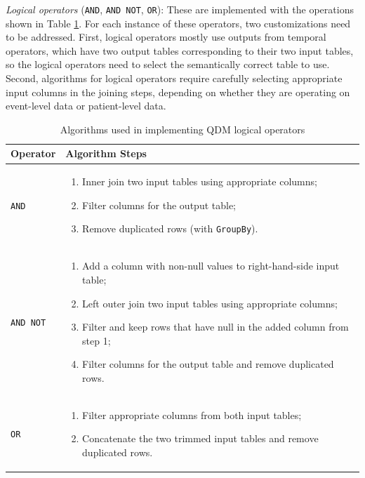 \documentclass{article}
\begin{document}
\textit{Logical operators} (\texttt{AND}, \texttt{AND NOT}, \texttt{OR}): These
are implemented with the operations shown in Table \ref{tab:boolean}.  For each instance of these operators, two customizations need to be addressed.  First, logical operators mostly use outputs from temporal operators, which have two output tables corresponding to their two input tables, so the logical operators need to select the semantically correct table to use.  Second, algorithms for logical operators require carefully selecting appropriate input columns in the joining steps, depending on whether they are operating on event-level data or patient-level data.

\vspace{5pt}
\begin{table}[h]
\begin{center}
\begin{tabular}{p{}p{}}
\toprule
Operator	&Algorithm Steps \\
\midrule
\texttt{AND}	&\begin{enumerate} 
  \item Inner join two input tables using appropriate columns;
  \item Filter columns for the output table;
  \item Remove duplicated rows (with \texttt{GroupBy}).
\end{enumerate}
\\ 
\texttt{AND NOT}	&\begin{enumerate} 
  \item Add a column with non-null values to right-hand-side input table;
  \item Left outer join two input tables using appropriate columns;
  \item Filter and keep rows that have null in the added column from step 1;
  \item Filter columns for the output table and remove duplicated rows.
\end{enumerate}
\\ 
\texttt{OR}	&\begin{enumerate} 
  \item Filter appropriate columns from both input tables;
  \item Concatenate the two trimmed input tables and remove duplicated rows.
\end{enumerate}
\\ 
\bottomrule
\end{tabular}
\caption{Algorithms used in implementing QDM logical operators} 
\label{tab:boolean}
\end{center}
\end{table}
\end{document}
